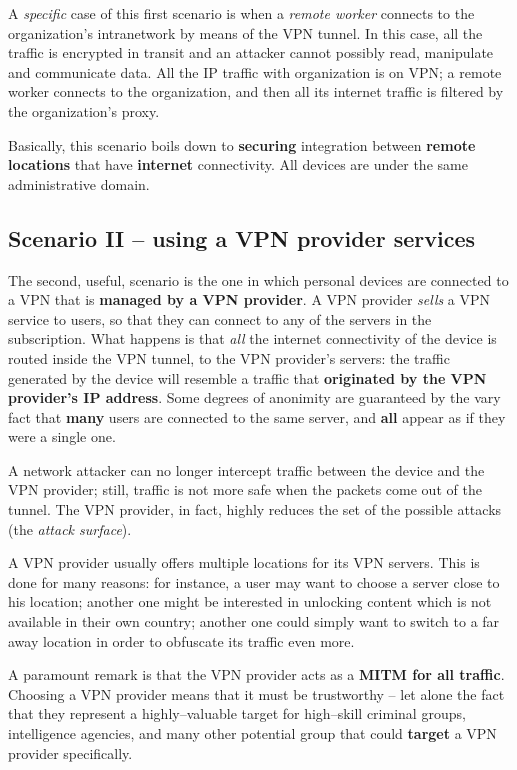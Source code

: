\documentclass[10pt]{extbook}
\begin{document}
A \emph{specific} case of this first scenario is when a \emph{remote worker}
connects to the organization's intranetwork by means of the VPN tunnel. In this
case, all the traffic is encrypted in transit and an attacker cannot possibly
read, manipulate and communicate data. All the IP traffic with organization is
on VPN; a remote worker connects to the organization, and then all its internet
traffic is filtered by the organization's proxy.

Basically, this scenario boils down to \textbf{securing} integration between
\textbf{remote locations} that have \textbf{internet} connectivity. All devices
are under the same administrative domain.

\subsection{Scenario II -- using a VPN provider services}

The second, useful, scenario is the one in which personal devices are connected
to a VPN that is \textbf{managed by a VPN provider}. A VPN provider
\emph{sells} a VPN service to users, so that they can connect to any of the
servers in the subscription. What happens is that \emph{all} the internet
connectivity of the device is routed inside the VPN tunnel, to the VPN
provider's servers: the traffic generated by the device will resemble a traffic
that \textbf{originated by the VPN provider's IP address}. Some degrees of
anonimity are guaranteed by the vary fact that \textbf{many} users are
connected to the same server, and \textbf{all} appear as if they were a single
one.

A network attacker can no longer intercept traffic between the device and the
VPN provider; still, traffic is not more safe when the packets come out of the
tunnel. The VPN provider, in fact, highly reduces the set of the possible
attacks (the \emph{attack surface}).

A VPN provider usually offers multiple locations for its VPN servers. This is
done for many reasons: for instance, a user may want to choose a server close
to his location; another one might be interested in unlocking content which is
not available in their own country; another one could simply want to switch to
a far away location in order to obfuscate its traffic even more.

A paramount remark is that the VPN provider acts as a \textbf{MITM for all
traffic}. Choosing a VPN provider means that it must be trustworthy -- let
alone the fact that they represent a highly--valuable target for high--skill
criminal groups, intelligence agencies, and many other potential group that
could \textbf{target} a VPN provider specifically.
\end{document}
